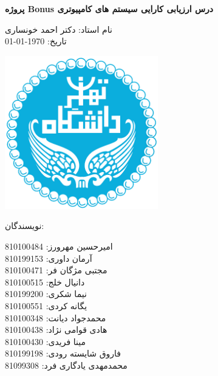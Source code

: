 \documentclass[a4paper,14pt]{article}
\begin{document}
	\fontsize{14}{14}\selectfont
	
	
	
	\begin{titlepage}
		\begin{center}
			
			\Huge
			
			\textbf{پروژه Bonus درس ارزیابی کارایی سیستم های کامپیوتری}
			
			\vspace{1cm}
			
			\LARGE
			
			
			نام استاد: دکتر احمد خونساری\\
				تاریخ: \today
			
			\vspace{1cm}
			
			\includegraphics[width=0.5\textwidth]{teh.png}
			
			
			
			نویسندگان:\\
			
			\vspace{0.5cm}
			
			امیرحسین مهرورز: 810100484\\
			آرمان داوری: 810199153\\
			مجتبی مژگان فر: 810100471\\
			دانیال خلج: 810100515\\
			نیما شکری: 810199200\\
			یگانه کردی: 810100551\\
			محمدجواد دیانت: 810100348\\
			هادی قوامی نژاد: 810100438\\
			مینا فریدی: 810100430\\
			فاروق شایسته رودی: 810199198\\
			محمدمهدی یادگاری فرد: 81099308
			
			\vspace{0.5cm}
			
		
		
			
		\end{center}
	\end{titlepage}
	
\end{document}
